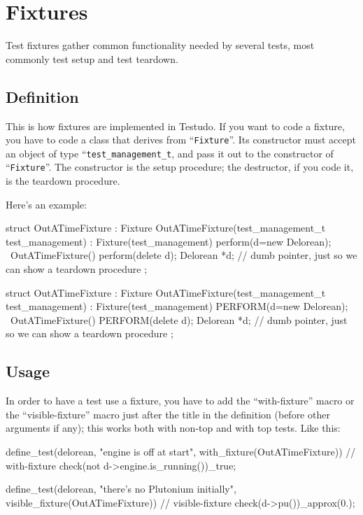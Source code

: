 \documentclass[twoside, a4paper, article]{memoir}
\begin{document}
\chapter{Fixtures}
\label{cha:fixtures}

Test fixtures gather common functionality needed by several tests, most
commonly test setup and test teardown.

\section{Definition}
\label{sec:fixture-definition}

This is how fixtures are implemented in Testudo.  If you want to code a
fixture, you have to code a class that derives from
``\texttt{Fixture}''.  Its constructor must accept an object of type
``\texttt{test\_management\_t}, and pass it out to the constructor of
``\texttt{Fixture}''.  The constructor is the setup procedure; the
destructor, if you code it, is the teardown procedure.

Here's an example:
\begin{cpplisting}
struct OutATimeFixture : Fixture {
  OutATimeFixture(test_management_t test_management)
    : Fixture(test_management)
    { perform(d=new Delorean); }
  ~OutATimeFixture()
    { perform(delete d); }
  Delorean *d; // dumb pointer, just so we can show a teardown procedure
};
\end{cpplisting}

\begin{cpplisting}
struct OutATimeFixture : Fixture
{
  OutATimeFixture(test_management_t test_management)
    : Fixture(test_management)
  {
    PERFORM(d=new Delorean);
  }
  ~OutATimeFixture()
  {
    PERFORM(delete d);
  }
  Delorean *d; // dumb pointer, just so we can show a teardown procedure
};
\end{cpplisting}

\section{Usage}
\label{sec:fixture-usage}

In order to have a test use a fixture, you have to add the ``with-fixture''
macro or the ``visible-fixture'' macro just after the title in the definition
(before other arguments if any); this works both with non-top and with top
tests.  Like this:
\begin{cpplisting}
define_test(delorean,
            "engine is off at start",
            with_fixture(OutATimeFixture)) // with-fixture
{
  check(not d->engine.is_running())_true;
}

define_test(delorean,
            "there's no Plutonium initially",
            visible_fixture(OutATimeFixture)) // visible-fixture
{
  check(d->pu())_approx(0.);
}
\end{cpplisting}
\end{document}
